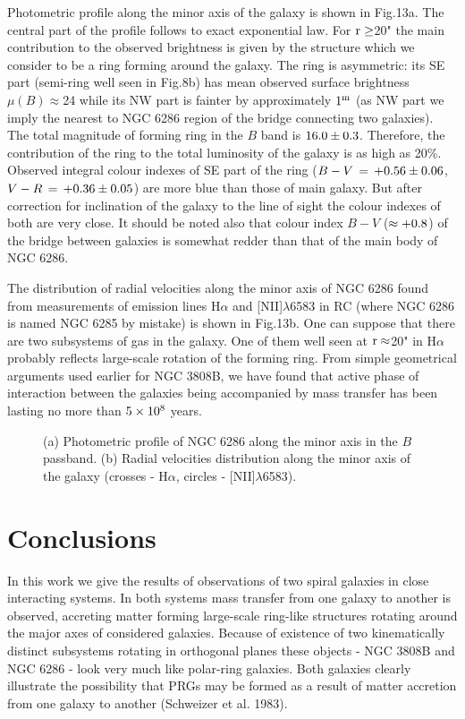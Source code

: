 Photometric profile along the minor axis of the galaxy is
shown in Fig.13a. The central part of the profile follows
to exact exponential law. For $\rm r\geq$20" the main contribution
to the observed brightness is given by the structure which we
consider to be a ring forming around the galaxy.
The ring is asymmetric: its SE part (semi-ring well seen in
Fig.8b) has mean observed surface brightness $\mu(B)\approx$24
while its NW part is fainter by approximately $\rm 1^{m}$
(as NW part we imply the nearest to NGC 6286 region of the
bridge connecting two galaxies). The total magnitude of 
forming ring in the $B$ band is $\rm 16.0\pm0.3$. Therefore,
the contribution of the ring to the total luminosity of the
galaxy is as high as 20\%. Observed integral colour indexes
of SE part of the ring ($B-V\,=\rm\,+0.56\pm0.06$, $V-R\,=\rm\,
+0.36\pm0.05$) are more blue than those of main galaxy.
But after correction for inclination of the galaxy to the
line of sight the colour indexes of both are very close.
It should be noted also that colour index $B-V$ ($\rm\approx +0.8$) 
of the bridge
between galaxies is somewhat redder than that of the main
body of NGC 6286.

The distribution of radial velocities along the minor axis of
NGC 6286 found from measurements of emission lines H$\alpha$
and [NII]$\lambda$6583 in RC (where NGC 6286 is named NGC 6285
by mistake) is shown in Fig.13b. 
One can suppose that there are two subsystems of gas in the galaxy.
One of them well seen at $\rm r\approx$20" in H$\alpha$ probably
reflects large-scale rotation of the forming ring. 
From simple geometrical arguments used
earlier for NGC 3808B, we have found that active phase of
interaction between the galaxies being accompanied by mass
transfer has been lasting no more than $\rm 5\times10^{8}$ years. 

\begin{figure}
\picplace{1.5cm}
\caption[13]{
(a) Photometric profile of NGC 6286 along the minor
axis in the $B$ passband. 
(b) Radial velocities distribution along the minor axis
of the galaxy (crosses - H$\alpha$, circles - [NII]$\lambda$6583).
}
\end{figure}

\section{Conclusions}

In this work we give the results of observations of two spiral
galaxies in close interacting systems. In both systems mass
transfer from one galaxy to another is observed, accreting 
matter forming large-scale ring-like structures rotating around
the major axes of considered galaxies. Because of existence
of two kinematically distinct subsystems rotating in orthogonal
planes these objects - NGC 3808B and NGC 6286 - look very much
like polar-ring galaxies. Both galaxies clearly illustrate
the possibility that PRGs may be formed as a result of matter
accretion from one galaxy to another (Schweizer et al. 1983).

